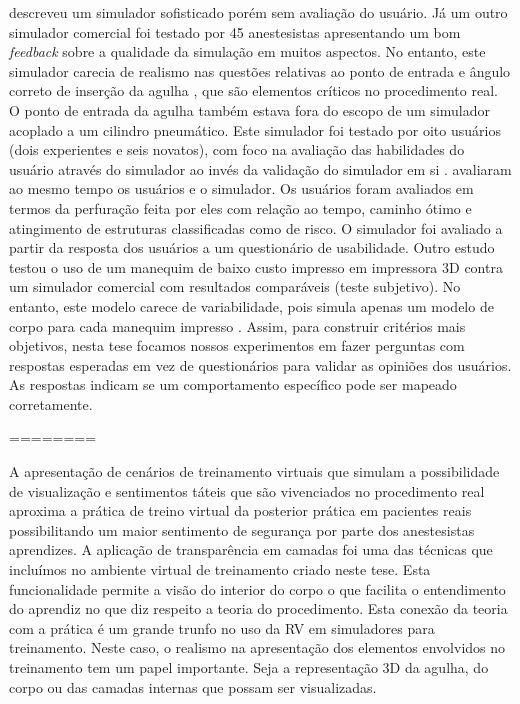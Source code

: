 \textcite{N.2013} descreveu um simulador sofisticado porém sem avaliação do usuário. Já um outro simulador comercial foi testado por 45 anestesistas apresentando um bom \textit{feedback} sobre a qualidade da simulação em muitos aspectos. No entanto, este simulador carecia de realismo nas questões relativas ao ponto de entrada e ângulo correto de inserção da agulha \cite{Lee2012}, que são elementos críticos no procedimento real. O ponto de entrada da agulha também estava fora do escopo de um simulador acoplado a um cilindro pneumático. Este simulador foi testado por oito usuários (dois experientes e seis novatos), com foco na avaliação das habilidades do usuário através do simulador ao invés da validação do simulador em si \cite{Senac2019}. \cite{Farber2009} avaliaram ao mesmo tempo os usuários e o simulador. Os usuários foram avaliados em termos da perfuração feita por eles com relação ao tempo, caminho ótimo e atingimento de estruturas classificadas como de risco. O simulador foi avaliado a partir da resposta dos usuários a um questionário de usabilidade. Outro estudo testou o uso de um manequim de baixo custo impresso em impressora 3D contra um simulador comercial com resultados comparáveis (teste subjetivo). No entanto, este modelo carece de variabilidade, pois simula apenas um modelo de corpo para cada manequim impresso \cite{Mashari2018}. Assim, para construir critérios mais objetivos, nesta tese focamos nossos experimentos em fazer perguntas com respostas esperadas em vez de questionários para validar as opiniões dos usuários. As respostas indicam se um comportamento específico pode ser mapeado corretamente.

========

A apresentação de cenários de treinamento virtuais que simulam a possibilidade de visualização e sentimentos táteis que são vivenciados no procedimento real aproxima a prática de treino virtual da posterior prática em pacientes reais possibilitando um maior sentimento de segurança por parte dos anestesistas aprendizes. A aplicação de transparência em camadas foi uma das técnicas que incluímos no ambiente virtual de treinamento criado neste tese. Esta funcionalidade permite a visão do interior do corpo o que facilita o entendimento do aprendiz no que diz respeito a teoria do procedimento. Esta conexão da teoria com a prática é um grande trunfo no uso da \acrfull{RV} em simuladores para treinamento. Neste caso, o realismo na apresentação dos elementos envolvidos no treinamento tem um papel importante. Seja a representação 3D da agulha, do corpo ou das camadas internas que possam ser visualizadas. 


